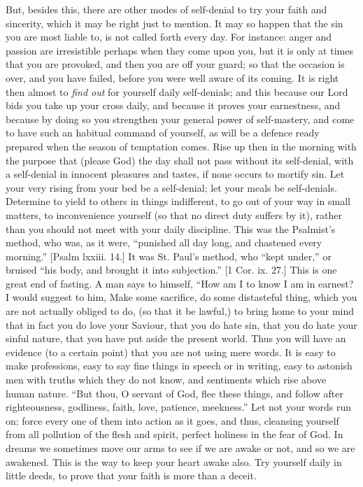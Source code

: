 But, besides this, there are other modes of
self-denial to try your faith and sincerity, which it may
be right just to mention. It may so happen that the sin
you are most liable to, is not called forth every day.
For instance: anger and passion are irresistible perhaps
when they come upon you, but it is only at times that you
are provoked, and then you are off your guard; so that
the occasion is over, and you have failed, before you
were well aware of its coming. It is right then almost to
\emph{find out} for yourself daily self-denials; and
this because our Lord bids you take up your cross daily,
and because it proves your earnestness, and because by
doing so you strengthen your general power of
self-mastery, and come to have such an habitual command
of yourself, as will be a defence ready prepared when the
season of temptation comes. Rise up then in the morning
with the purpose that (please God) the day shall not pass
without its self-denial, with a self-denial in innocent
pleasures and tastes, if none occurs to mortify sin. Let
your very rising from your bed be a self-denial; let your
meals be self-denials. Determine to yield to others in
things indifferent, to go out of your way in small
matters, to inconvenience yourself (so that no direct
duty suffers by it), rather than you should not meet with
your daily discipline. This was the Psalmist's method,
who was, as it were, ``punished all day long, and
chastened every morning.'' [Psalm lxxiii. 14.] It was
St. Paul's method, who ``kept under,'' or bruised
``his body, and brought it into subjection.'' [1
Cor. ix. 27.] This is one great end of fasting. A man
says to himself, ``How am I to know I am in earnest?
I would suggest to him, Make some sacrifice, do some
distasteful thing, which you are not actually obliged to
do, (so that it be lawful,) to bring home to your mind
that in fact you do love your Saviour, that you do hate
sin, that you do hate your sinful nature, that you have
put aside the present world. Thus you will have an
evidence (to a certain point) that you are not using mere
words. It is easy to make professions, easy to say fine
things in speech or in writing, easy to astonish men with
truths which they do not know, and sentiments which rise
above human nature. ``But thou, O servant of God,
flee these things, and follow after righteousness,
godliness, faith, love, patience, meekness.'' Let not
your words run on; force every one of them into action as
it goes, and thus, cleansing yourself from all pollution
of the flesh and spirit, perfect holiness in the fear of
God. In dreams we sometimes move our arms to see if we
are awake or not, and so we are awakened. This is the way
to keep your heart awake also. Try yourself daily in
little deeds, to prove that your faith is more than a
deceit.

